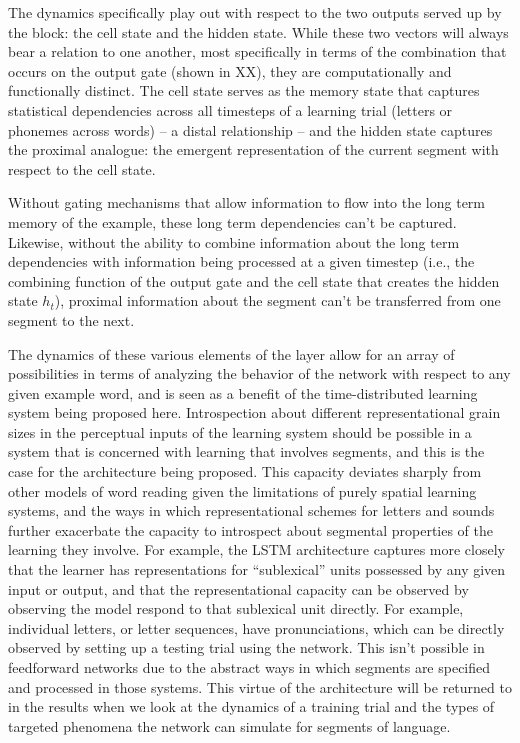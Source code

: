 \documentclass[
  american,
  man,floatsintext]{apa6}
\begin{document}
The dynamics specifically play out with respect to the two outputs served up by the block: the cell state and the hidden state. While these two vectors will always bear a relation to one another, most specifically in terms of the combination that occurs on the output gate (shown in XX), they are computationally and functionally distinct. The cell state serves as the memory state that captures statistical dependencies across all timesteps of a learning trial (letters or phonemes across words) -- a distal relationship -- and the hidden state captures the proximal analogue: the emergent representation of the current segment with respect to the cell state.

Without gating mechanisms that allow information to flow into the long term memory of the example, these long term dependencies can't be captured. Likewise, without the ability to combine information about the long term dependencies with information being processed at a given timestep (i.e., the combining function of the output gate and the cell state that creates the hidden state \(h_t\)), proximal information about the segment can't be transferred from one segment to the next.

The dynamics of these various elements of the layer allow for an array of possibilities in terms of analyzing the behavior of the network with respect to any given example word, and is seen as a benefit of the time-distributed learning system being proposed here. Introspection about different representational grain sizes in the perceptual inputs of the learning system should be possible in a system that is concerned with learning that involves segments, and this is the case for the architecture being proposed. This capacity deviates sharply from other models of word reading given the limitations of purely spatial learning systems, and the ways in which representational schemes for letters and sounds further exacerbate the capacity to introspect about segmental properties of the learning they involve. For example, the LSTM architecture captures more closely that the learner has representations for ``sublexical'' units possessed by any given input or output, and that the representational capacity can be observed by observing the model respond to that sublexical unit directly. For example, individual letters, or letter sequences, have pronunciations, which can be directly observed by setting up a testing trial using the network. This isn't possible in feedforward networks due to the abstract ways in which segments are specified and processed in those systems. This virtue of the architecture will be returned to in the results when we look at the dynamics of a training trial and the types of targeted phenomena the network can simulate for segments of language.
\end{document}

